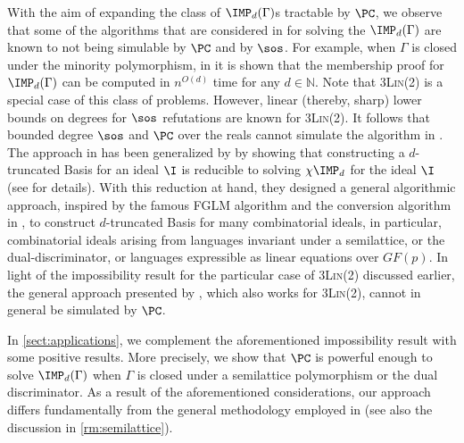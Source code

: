 \documentclass[11pt]{article}
\begin{document}
With the aim of expanding the class of $\IMP_d(\Gamma)$s tractable by $\PC$, we observe that some of the algorithms that are considered in \cite{BulatovRSTOC22, BulatovRSTACS22, Mastrolilli21TALG, BharathiM21} for solving the $\IMP_d(\Gamma)$ are known to not being simulable by $\PC$ and by $\sos$.  For example, when $\Gamma$ is closed under the minority polymorphism, in \cite{BharathiM21} it is shown that the membership proof for $\IMP_d(\Gamma)$ can be computed in $n^{O(d)}$ time for any $d\in \mathbb{N}$.
Note that \textsc{3Lin(2)} is a special case of this class of problems. However,  linear (thereby, sharp) lower bounds on degrees for $\sos$ refutations are known \cite{GRIGORIEV2001613} for \textsc{3Lin(2)}.
%
It follows that bounded degree $\sos$ and $\PC$ over the reals cannot simulate the algorithm in \cite{BharathiM21}. 
The approach in \cite{BharathiM21} has been generalized by \cite{BulatovRSTOC22} by showing that constructing a $d$-truncated \GB Basis for an ideal $\I$ is reducible to solving $\chi\IMP_d$ for the ideal $\I$ (see \cite{BulatovRSTOC22} for details). With this reduction at hand, they designed a general algorithmic approach,
inspired by the famous FGLM algorithm \cite{FAUGERE1993329} and the conversion algorithm in \cite{BharathiM21}, to construct $d$-truncated \GB Basis for many combinatorial ideals, in particular, combinatorial ideals arising from languages invariant under a semilattice, or the dual-discriminator, or languages expressible as linear equations over $GF(p)$. In light of the impossibility result for the particular case of \textsc{3Lin(2)} discussed earlier, the general approach presented by \cite{BulatovRSTOC22}, which also works for \textsc{3Lin(2)}, cannot in general be simulated by $\PC$.

In \cref{sect:applications}, we complement the aforementioned impossibility result with some positive results. 
More precisely, we show that $\PC$ is powerful enough to solve $\IMP_d(\Gamma)$ when $\Gamma$ is closed under a semilattice polymorphism or the dual discriminator. 
As a result of the aforementioned considerations, our approach differs fundamentally from the general methodology employed in \cite{BulatovRSTOC22} (see also the discussion in \cref{rm:semilattice}).
%
\end{document}
